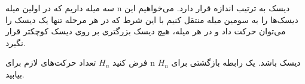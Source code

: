 \p 
    سه میله داریم که در اولین میله n دیسک به ترتیب اندازه قرار دارد. ‌می‌خواهیم این دیسک‌ها را به سومین میله منتقل کنیم با این شرط که در هر مرحله تنها یک دیسک را می‌توان حرکت داد و در هر میله، هیچ دیسک بزرگتری بر روی دیسک‌ کوچکتر قرار نگیرد. 

    فرض کنید 
    ${H_n}$
    تعداد حرکت‌های لازم برای
    n
    دیسک باشد.
    یک رابطه بازگشتی برای
    ${H_n}$
    بیابید.
